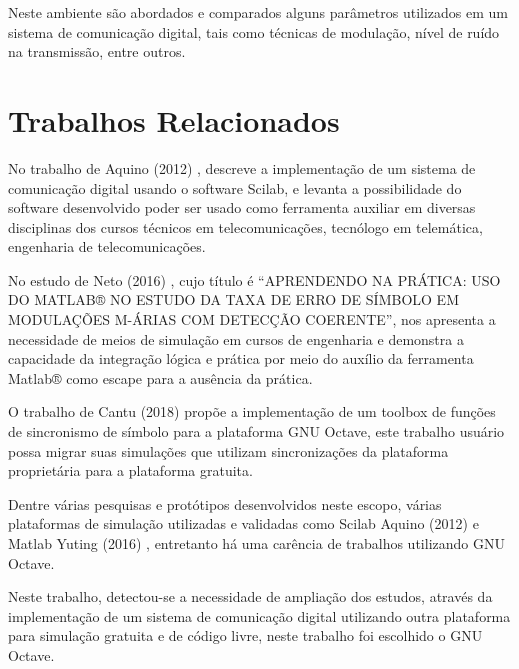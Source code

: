Neste ambiente são abordados e comparados alguns parâmetros utilizados em um sistema de comunicação digital, tais como técnicas de modulação, nível de ruído na transmissão, entre outros. 

\section{Trabalhos Relacionados }

No trabalho de Aquino (2012) \cite{aquino2012modelo}, descreve a implementação de um sistema de comunicação digital usando o software Scilab, e levanta a possibilidade do software desenvolvido poder ser usado como ferramenta auxiliar em diversas disciplinas dos cursos técnicos em telecomunicações, tecnólogo em telemática, engenharia de telecomunicações. 

No estudo de Neto (2016) \cite{netoaprendendo}, cujo título é “APRENDENDO NA PRÁTICA: USO 
DO MATLAB® NO ESTUDO DA TAXA DE ERRO DE SÍMBOLO EM MODULAÇÕES M-ÁRIAS COM DETECÇÃO COERENTE”, nos apresenta a necessidade de meios de simulação em cursos de engenharia e demonstra a capacidade da integração lógica e prática por meio do auxílio da ferramenta Matlab® como escape para a ausência da prática. 

O trabalho de Cantu (2018) \cite{Cantur:2018:IFSC} propõe a implementação de um toolbox de funções de sincronismo de símbolo para a plataforma GNU Octave, este trabalho usuário possa migrar suas simulações que utilizam sincronizações da plataforma proprietária para a plataforma gratuita. 

Dentre várias pesquisas e protótipos desenvolvidos neste escopo, várias plataformas de simulação utilizadas e validadas como Scilab Aquino (2012) \cite{aquino2012modelo} e Matlab Yuting (2016) \cite{yuting2010simulation}, entretanto há uma carência de trabalhos utilizando GNU Octave. 

Neste trabalho, detectou-se a necessidade de ampliação dos estudos, através da implementação de um sistema de comunicação digital utilizando outra plataforma para simulação gratuita e de código livre, neste trabalho foi escolhido o GNU Octave. 
